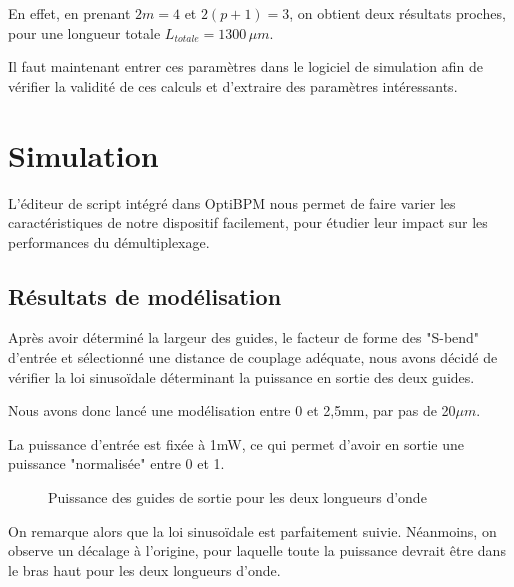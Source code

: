 \documentclass[a4paper,11pt]{report}
\begin{document}
En effet, en prenant $2m=4$ et $2(p+1)=3$, on obtient deux résultats proches, pour une longueur totale $L_{totale}=1300\,\mu m$.

Il faut maintenant entrer ces paramètres dans le logiciel de simulation afin de vérifier la validité de ces calculs et d'extraire des paramètres intéressants.
\chapter{Simulation} 

L'éditeur de script intégré dans OptiBPM nous permet de faire varier les caractéristiques de notre dispositif facilement, pour étudier leur impact sur les performances du démultiplexage.


\section{Résultats de modélisation}
Après avoir déterminé la largeur des guides, le facteur de forme des "S-bend" d'entrée et sélectionné une distance de couplage adéquate, nous avons décidé de vérifier la loi sinusoïdale déterminant la puissance en sortie des deux guides.

Nous avons donc lancé une modélisation entre 0 et 2,5mm, par pas de 20$\mu m$.

La puissance d'entrée est fixée à 1mW, ce qui permet d'avoir en sortie une puissance "normalisée" entre 0 et 1.

\begin{figure}[h]
    \begin{center}
        \caption{Puissance des guides de sortie pour les deux longueurs d'onde}
        \label{big_graph}
    \end{center}
\end{figure}
On remarque alors que la loi sinusoïdale est parfaitement suivie. Néanmoins, on observe un décalage à l'origine, pour laquelle toute la puissance devrait être dans le bras haut pour les deux longueurs d'onde.
\end{document}
